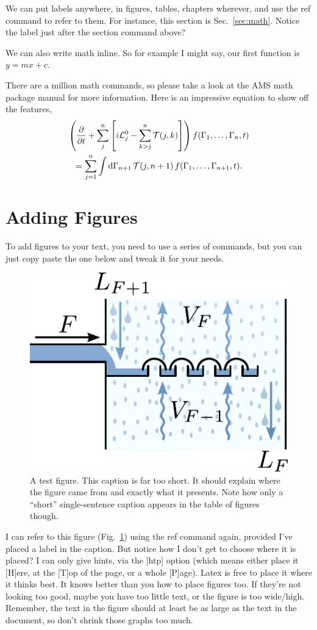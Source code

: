 \documentclass[12pt,MEng]{UoAThesis}
\begin{document}
We can put labels anywhere, in figures, tables, chapters wherever, and
use the ref command to refer to them. For instance, this section is
Sec.~\ref{sec:math}. Notice the label just after the section command
above?

We can also write math inline. So for example I might say, our first
function is $y=mx+c$. 

There are a million math commands, so please take a look at the AMS
math package manual for more information. Here is an impressive 
equation to show off the features,
\begin{multline}
  \left( \frac{\partial}{\partial t} + \sum_{j}^n \left[ i{\mathcal
        L}^0_j - \sum_{k > j}^n {\mathcal T}(j,k) \right]\right)
  f({\Gamma}_1,\dots,{\Gamma}_n,t)
  \\
  = \sum_{j=1}^{n} \int {\rm d}{\Gamma}_{n+1}\, {\mathcal T}(j,n+1)\,
  f({\Gamma}_1,\dots,{\Gamma}_{n+1},t).
\end{multline}

\section{Adding Figures}
To add figures to your text, you need to use a series of commands, but
you can just copy paste the one below and tweak it for your needs.
\begin{figure}[htp]
  \centering
  \includegraphics[clip,width=0.5\linewidth]{figures/testfig}
  \caption[A test figure]{\label{fig:testfig} A test figure. This
    caption is far too short. It should explain where the figure came
    from and exactly what it presents. Note how only a ``short''
    single-sentence caption appears in the table of figures though.}
\end{figure}

I can refer to this figure (Fig.~\ref{fig:testfig}) using the ref
command again, provided I've placed a label in the caption. But notice
how I don't get to choose where it is placed? I can only give hints,
via the [htp] option (which means either place it [H]ere, at the [T]op
of the page, or a whole [P]age). Latex is free to place it where it
thinks best. It knows better than you how to place figures too. If
they're not looking too good, maybe you have too little text, or the
figure is too wide/high. Remember, the text in the figure should at
least be as large as the text in the document, so don't shrink those
graphs too much.
\end{document}
